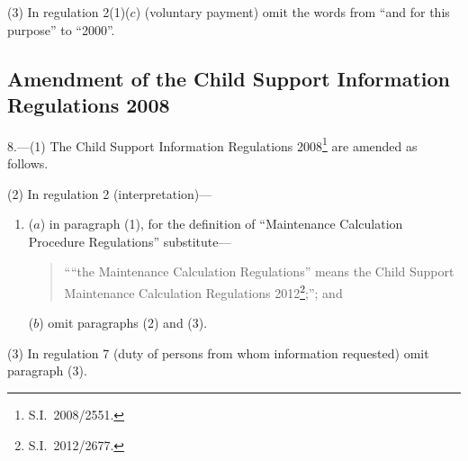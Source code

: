 \documentclass[12pt,a4paper]{article}
\begin{document}
(3) In regulation 2(1)($c$)  (voluntary payment) omit the words from “and for this purpose” to “2000”.

\subsection[8. Amendment of the Child Support Information Regulations 2008]{Amendment of the Child Support Information Regulations 2008}

8.---(1)  The Child Support Information Regulations 2008\footnote{S.I.~2008/2551.} are amended as follows.

(2) In regulation 2 (interpretation)—
\begin{enumerate}\item[]
($a$) in paragraph (1), for the definition of “Maintenance Calculation Procedure Regulations” substitute—
\begin{quotation}
““the Maintenance Calculation Regulations” means the Child Support Maintenance Calculation Regulations 2012\footnote{S.I.~2012/2677.};”; and
\end{quotation}

($b$) omit paragraphs (2) and (3).
\end{enumerate}

(3) In regulation 7 (duty of persons from whom information requested) omit paragraph (3).
\end{document}
